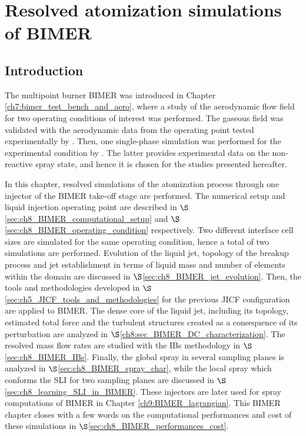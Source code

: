 \chapter{Resolved atomization simulations of BIMER}
\label{ch8:bimer_resolved_atomization}


\section{Introduction}

The multipoint burner BIMER was introduced in Chapter \ref{ch7:bimer_test_bench_and_aero}, where a study of the aerodynamic flow field for two operating conditions of interest was performed. The gaseous field was validated with the aerodynamic data from the operating point tested experimentally by . Then, one single-phase simulation was performed for the experimental condition by . The latter provides experimental data on the non-reactive spray state, and hence it is chosen for the studies presented hereafter.

In this chapter, resolved simulations of the atomization process through one injector of the BIMER take-off stage are performed. The numerical setup and liquid injection operating point are described in $\S$\ref{sec:ch8_BIMER_computational_setup} and $\S$\ref{sec:ch8_BIMER_operating_condition} respectively. Two different interface cell sizes are simulated for the same operating condition, hence a total of two simulations are performed. Evolution of the liquid jet, topology of the breakup process and jet establishment in terms of liquid mass and number of elements within the domain are discussed in $\S$\ref{sec:ch8_BIMER_jet_evolution}. Then, the tools and methodologies developed in $\S$\ref{sec:ch5_JICF_tools_and_methodologies} for the previous JICF configuration are applied to BIMER. The dense core of the liquid jet, including its topology, estimated total force and the turbulent structures created as a consequence of its perturbation are analyzed in $\S$\ref{ch8:sec_BIMER_DC_characterization}. The resolved mass flow rates are studied with the IBs methodology in $\S$\ref{sec:ch8_BIMER_IBs}. Finally, the global spray in several sampling planes is analyzed in $\S$\ref{sec:ch8_BIMER_spray_char}, while the local spray which conforms the SLI for two sampling planes are discussed in $\S$\ref{sec:ch8_learning_SLI_in_BIMER}. These injectors are later used for spray computations of BIMER in Chapter \ref{ch9:BIMER_lagrangian}. This BIMER chapter closes with a few words on the computational performances and cost of these simulations in $\S$\ref{sec:ch8_BIMER_performances_cost}.




